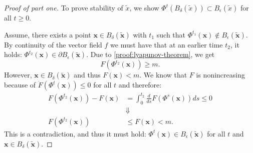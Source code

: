 \documentclass[hidelinks,a4paper, 11pt]{article}
\theoremstyle{plain}
\theoremstyle{break}
\theoremstyle{plain}
\theoremstyle{definition}
\begin{document}
\begin{proof}[Proof of part one]
	To prove stability of $\tilde x$, we show $\Phi^t(B_{\delta}(\tilde x)) \subset B_{\epsilon}(\tilde x)$ for all $t \geq 0$. 
	
	Assume, there exists a point $\mathbf x \in B_{\delta}(\mathbf{\tilde x})$ with  $t_1$ such that $\Phi^{t_1}(\mathbf x) \notin B_{\epsilon}(\mathbf{\tilde x})$. By continuity of the vector field $f$ we must have that at an earlier time $t_2$, it holds: $\Phi^{t_2}(\mathbf x) \in \partial B_{\epsilon}(\mathbf{\tilde x})$. Due to \eqref{proof:lyapunov-theorem}, we get 
	\[
		F(\Phi^{t_2}(\mathbf x)) \geq m.
	\]
	However, $\mathbf x \in B_{\delta}(\mathbf{\tilde x})$ and thus $F(\mathbf x) < m$. We know that $F$ is nonincreasing because of $\dot F(\Phi^t(\mathbf x)) \leq 0$ for all $t$ and therefore:
	\begin{align*}
		F(\Phi^{t_2}(\mathbf x)) - F(\mathbf x) &= \int^{t_2}_0 \frac{d}{ds}F(\Phi^s(\mathbf x)) ds \leq 0 \\
		&\Downarrow \\
			F(\Phi^{t_2}(\mathbf x))& \leq F(\mathbf x) < m.
	\end{align*}
	This is a contradiction, and thus it must hold: $\Phi^{t}(\mathbf x) \in B_{\epsilon}(\mathbf{\tilde x})$ for all $t$ and $\mathbf x \in B_{\delta}(\mathbf{\tilde x})$.
\end{proof}
\end{document}
